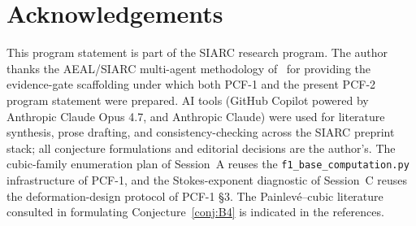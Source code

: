 \documentclass[11pt,a4paper]{article}
\theoremstyle{definition}
\theoremstyle{remark}
\begin{document}
\section{Acknowledgements}\label{sec:ack}

This program statement is part of the SIARC research program. The author
thanks the AEAL/SIARC multi-agent methodology of~\cite{P8AEAL} for
providing the evidence-gate scaffolding under which both PCF-1 and the
present PCF-2 program statement were prepared. AI tools (GitHub Copilot
powered by Anthropic Claude Opus 4.7, and Anthropic Claude) were used
for literature synthesis, prose drafting, and consistency-checking
across the SIARC preprint stack; all conjecture formulations and editorial
decisions are the author's. The cubic-family enumeration plan of
Session~A reuses the \texttt{f1\_base\_computation.py} infrastructure of
PCF-1, and the Stokes-exponent diagnostic of Session~C reuses the
deformation-design protocol of PCF-1 \S 3. The Painlev\'e--cubic
literature consulted in formulating Conjecture~\ref{conj:B4} is
indicated in the references.
\end{document}
